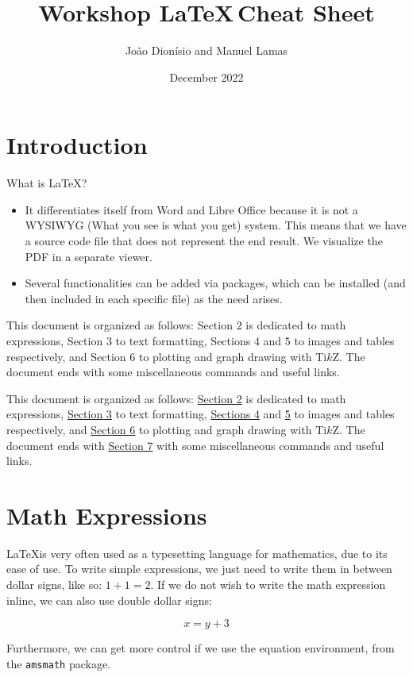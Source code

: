 \documentclass[10pt]{article}
\title{Workshop \LaTeX\,Cheat Sheet}
\author{João Dionísio and Manuel Lamas}
\date{December 2022}
\begin{document}
\maketitle

\section{Introduction}

What is \LaTeX?
\begin{itemize}
    \item It differentiates itself from Word and Libre Office because it is not a WYSIWYG (What you see is what you get) system. This means that we have a source code file that does not represent the end result. We visualize the PDF in a separate viewer.
    \item Several functionalities can be added via packages, which can be installed (and then included in each specific file) as the need arises.
\end{itemize}

This document is organized as follows: Section $2$ is dedicated to math expressions, Section $3$ to text formatting, Sections $4$ and $5$ to images and tables respectively, and Section $6$ to plotting and graph drawing with Ti$k$Z. The document ends with some miscellaneous commands and useful links.

This document is organized as follows: \hyperref[sec:math]{Section 2} is dedicated to math expressions, \hyperref[sec:text_format]{Section 3} to text formatting, \hyperref[sec:images]{Sections 4} and \hyperref[sec:tables]{5} to images and tables respectively, and \hyperref[sec:tikz]{Section 6} to plotting and graph drawing with Ti$k$Z. The document ends with \hyperref[sec:misc]{Section 7} with some miscellaneous commands and useful links.

\section{Math Expressions}
\label{sec:math}

\LaTeX is very often used as a typesetting language for mathematics, due to its ease of use. To write simple expressions, we just need to write them in between dollar signs, like so: $1+1=2$. If we do not wish to write the math expression inline, we can also use double dollar signs:

$$x = y + 3$$

Furthermore, we can get more control if we use the equation environment, from the \verb|amsmath| package.
\end{document}
